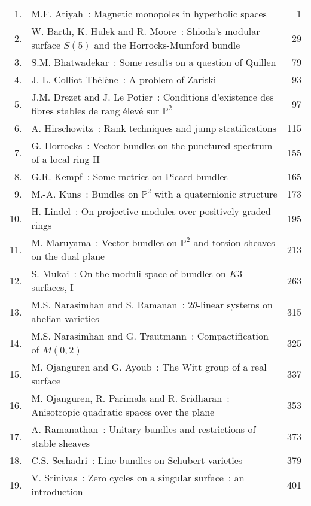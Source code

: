 \noindent
\renewcommand{\arraystretch}{1.7}
\begin{longtable}[l]{r>{\raggedright}p{9cm}r}
1. & M.F. Atiyah~: Magnetic monopoles in hyperbolic spaces & 1\\
2. & W. Barth, K. Hulek and R. Moore~: Shioda's modular surface
$S(5)$ and the Horrocks-Mumford bundle & 29\\
3. & S.M. Bhatwadekar~: Some results on a question of Quillen & 79\\
4. & J.-L. Colliot Th\'el\`ene~: A problem of Zariski & 93\\
5. & J.M. Drezet and J. Le Potier~: Conditions d'existence des fibres
stables de rang \'elev\'e sur $\mathbb{P}^{2}$ & 97\\
6. &  A. Hirschowitz~: Rank techniques and jump stratifications & 115\\
7. & G. Horrocks~: Vector bundles on the punctured spectrum of a
local ring II & 155\\
8. & G.R. Kempf~: Some metrics on Picard bundles & 165\\
9. &  M.-A. Kuns~: Bundles on $\mathbb{P}^{2}$ with a quaternionic
structure & 173\\
10. &  H. Lindel~: On projective modules over positively graded rings
& 195\\
11. & M. Maruyama~: Vector bundles on $\mathbb{P}^{2}$ and torsion
sheaves on the dual plane & 213\\
12. & S. Mukai~: On the moduli space of bundles on $K3$ surfaces, I & 263\\
13. & M.S. Narasimhan and S. Ramanan~: $2\theta$-linear systems on
abelian varieties & 315\\
14. & M.S. Narasimhan and G. Trautmann~: Compactification of $M(0,2)$
& 325\\
15. & M. Ojanguren and G. Ayoub~: The Witt group of a real surface & 337\\
16. &  M. Ojanguren, R. Parimala and R. Sridharan~: Anisotropic
quadratic spaces over the plane & 353\\
17. & A. Ramanathan~: Unitary bundles and restrictions of stable
sheaves & 373\\
18. & C.S. Seshadri~: Line bundles on Schubert varieties & 379\\
19. & V. Srinivas~: Zero cycles on a singular surface~: an
introduction & 401\\
\end{longtable}

\thispagestyle{empty}


